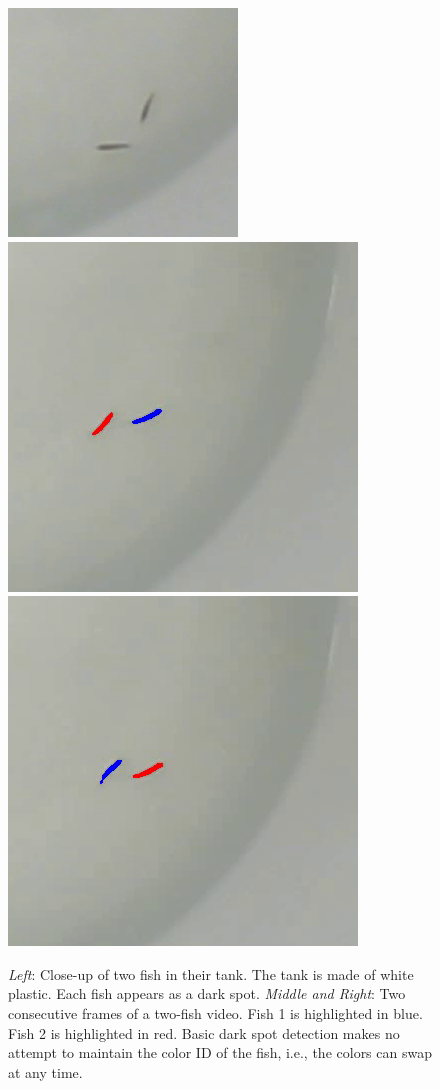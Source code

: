 \documentclass{article}
\newlength{\mylen}
\begin{document}
\begin{figure}[H]
	\centering
	\setlength{\mylen}{0.32\linewidth}
	\includegraphics[height=\mylen]{140cropped}%
	\hspace{0.01\linewidth}%
	\includegraphics[height=\mylen]{simple-swap1}%
	\hspace{0.01\linewidth}%
	\includegraphics[height=\mylen]{simple-swap2}
	\caption{\emph{Left}: Close-up of two fish in their tank. The tank is made of white plastic. Each fish appears as a dark spot. \emph{Middle and Right}: Two consecutive frames of a two-fish video. Fish 1 is highlighted in blue. Fish 2 is highlighted in red. Basic dark spot detection makes no attempt to maintain the color ID of the fish, i.e., the colors can swap at any time.}
	\label{fig:fish}
\end{figure}
\end{document}
